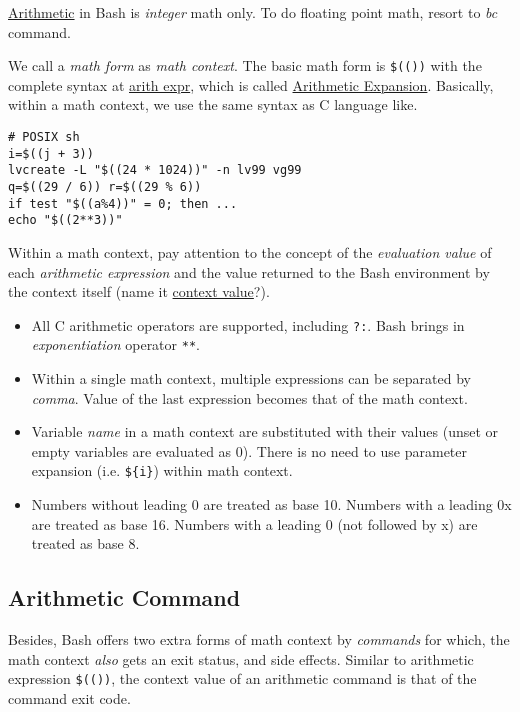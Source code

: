 \href{http://mywiki.wooledge.org/ArithmeticExpression}{Arithmetic}
in Bash is \textit{integer} math only. To do floating point math,
resort to \textit{bc} command.

We call a \textit{math form} as \textit{math context}. The basic
math form is
\lstinline|$(())| with the complete syntax at
\href{https://wiki.bash-hackers.org/syntax/arith_expr}{arith expr},
which is called \uline{Arithmetic Expansion}. Basically, within a
math context, we use the same syntax as C language like.

\begin{minipage}{1.0\linewidth}
\begin{lstlisting}
# POSIX sh
i=$((j + 3))
lvcreate -L "$((24 * 1024))" -n lv99 vg99
q=$((29 / 6)) r=$((29 % 6))
if test "$((a%4))" = 0; then ...
echo "$((2**3))"
\end{lstlisting}
\end{minipage}

Within a math context, pay attention to the concept of the
\textit{evaluation value} of each \textit{arithmetic expression}
and the value returned to the Bash environment by the context
itself (name it \uline{context value}?).

\begin{itemize}
\item All C arithmetic operators are supported, including
  \verb|?:|. Bash brings in \textit{exponentiation} operator
  \verb|**|.
\item Within a single math context, multiple expressions can be
  separated by \textit{comma}. Value of the last expression
  becomes that of the math context.
\item Variable \textit{name} in a math context are substituted
  with their values (unset or empty variables are evaluated as
  0). There is no need to use parameter expansion
  (i.e. \verb|${i}|) within math context.
\item Numbers without leading 0 are treated as base 10. Numbers
  with a leading 0x are treated as base 16. Numbers with a leading
  0 (not followed by x) are treated as base 8.
\end{itemize}

\subsection{Arithmetic Command}
\label{sec:bash-arithmetic-command}

Besides, Bash offers two extra forms of math context by
\textit{commands} for which, the math context \textit{also} gets
an exit status, and side effects. Similar to arithmetic expression
\lstinline|$(())|, the context value of an arithmetic command is
that of the command exit code.

